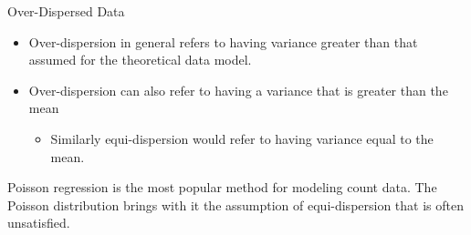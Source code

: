 \documentclass[
  ignorenonframetext,
]{beamer}
\providecommand{\tightlist}{%
  \setlength{\itemsep}{0pt}\setlength{\parskip}{0pt}}\usepackage{longtable,booktabs,array}
\begin{document}
\begin{frame}{Over-Dispersed Data}
\label{over-dispersed-data}
\begin{itemize}
\tightlist
\item
  Over-dispersion in general refers to having variance greater than that
  assumed for the theoretical data model.\\
\item
  Over-dispersion can also refer to having a variance that is greater
  than the mean

  \begin{itemize}
  \tightlist
  \item
    Similarly equi-dispersion would refer to having variance equal to
    the mean.
  \end{itemize}
\end{itemize}

\begin{tcolorbox}[enhanced jigsaw, coltitle=black, opacitybacktitle=0.6, colbacktitle=quarto-callout-note-color!10!white, arc=.35mm, colframe=quarto-callout-note-color-frame, opacityback=0, titlerule=0mm, left=2mm, toptitle=1mm, breakable, bottomtitle=1mm, title={Poisson regression}, rightrule=.15mm, bottomrule=.15mm, leftrule=.75mm, toprule=.15mm, colback=white]

Poisson regression is the most popular method for modeling count data.
The Poisson distribution brings with it the assumption of
equi-dispersion that is often unsatisfied.

\end{tcolorbox}
\end{frame}
\end{document}
